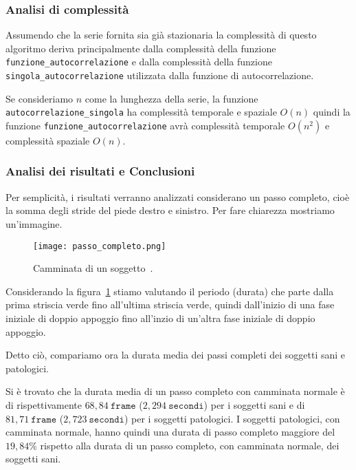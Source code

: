 \subsubsection{Analisi di complessità}
\begin{sloppypar}
Assumendo che la serie fornita sia già stazionaria la complessità di questo algoritmo 
deriva principalmente dalla complessità della funzione \texttt{funzione\_autocorrelazione} e dalla complessità
della funzione \texttt{singola\_autocorrelazione} utilizzata dalla funzione di autocorrelazione.

Se consideriamo $n$ come la lunghezza della serie, 
la funzione \texttt{autocorrelazione\_singola} ha complessità temporale e spaziale $O(n)$ quindi
la funzione \texttt{funzione\_autocorrelazione} avrà complessità temporale $O(n^2)$ e complessità
spaziale $O(n)$.
\end{sloppypar}


\subsubsection{Analisi dei risultati e Conclusioni}
Per semplicità, i risultati verranno analizzati considerano un passo completo, cioè la somma degli stride
del piede destro e sinistro. Per fare chiarezza mostriamo un'immagine.
\begin{figure}[H]
    \centering
    \texttt{[image: passo\_completo.png]}
    \caption{Camminata di un soggetto~\cite{cf:passo_completo}.}
    \label{fig:passo_completo}
\end{figure}
Considerando la figura~\ref*{fig:passo_completo} stiamo valutando il periodo (durata) che parte dalla prima striscia
verde fino all'ultima striscia verde, quindi dall'inizio di una fase iniziale di doppio appoggio fino all'inzio
di un'altra fase iniziale di doppio appoggio.

\begin{sloppypar}
Detto ciò, compariamo ora la durata media dei passi completi dei soggetti sani e patologici. 

Si è trovato che la durata media di un passo completo con camminata normale è di rispettivamente $68,84 \ \texttt{frame}$
($2,294 \ \texttt{secondi}$) per i soggetti sani e di 
$81,71 \ \texttt{frame}$ ($2,723 \ \texttt{secondi}$) per i soggetti patologici.
I soggetti patologici, con camminata normale, hanno quindi una durata di passo completo maggiore del 
$19,84\%$ rispetto alla durata di un passo completo, con camminata normale, dei soggetti sani.
\end{sloppypar}

